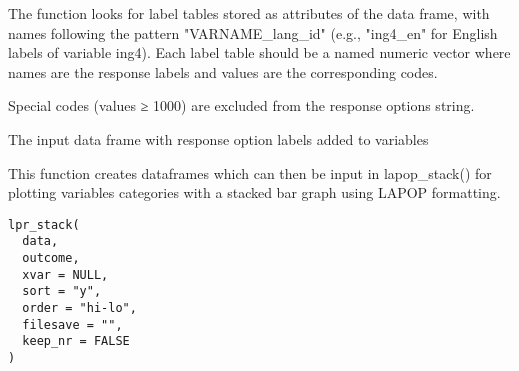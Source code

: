 \documentclass[a4paper]{book}
\begin{document}
%
\begin{Details}
The function looks for label tables stored as attributes of the data frame,
with names following the pattern "VARNAME\_lang\_id" (e.g., "ing4\_en" for English
labels of variable ing4). Each label table should be a named numeric vector where
names are the response labels and values are the corresponding codes.

Special codes (values ≥ 1000) are excluded from the response options string.
\end{Details}
%
\begin{Value}
The input data frame with response option labels added to variables
\end{Value}
%
\begin{Examples}
\end{Examples}
%
\begin{Description}
This function creates dataframes which can then be input in lapop\_stack() for
plotting variables categories with a stacked bar graph using LAPOP formatting.
\end{Description}
%
\begin{Usage}
\begin{verbatim}
lpr_stack(
  data,
  outcome,
  xvar = NULL,
  sort = "y",
  order = "hi-lo",
  filesave = "",
  keep_nr = FALSE
)
\end{verbatim}
\end{Usage}
%
\end{document}
